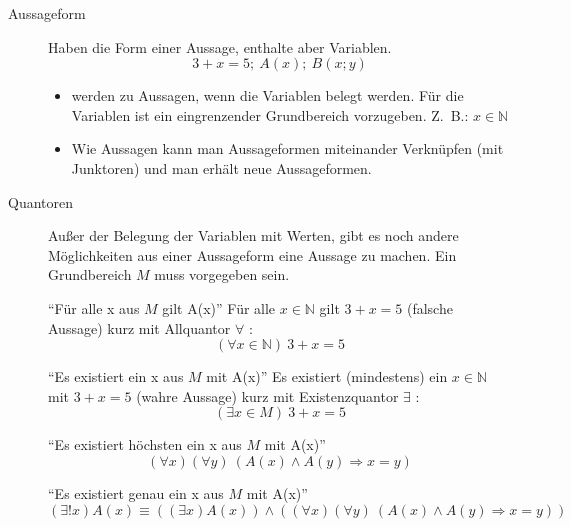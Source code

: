 \begin{description}
    \item[Aussageform] Haben die Form einer Aussage, enthalte aber Variablen.
    \[3 + x = 5;\ A(x);\ B(x;y)\]
    \begin{itemize}
        \item werden zu Aussagen, wenn die Variablen belegt werden.
        Für die Variablen ist ein eingrenzender Grundbereich vorzugeben.
        Z.~B.: $x \in \mathbb{N}$
        \item Wie Aussagen kann man Aussageformen miteinander Verknüpfen (mit Junktoren) und man erhält neue Aussageformen.
    \end{itemize}
    \item[Quantoren] Außer der Belegung der Variablen mit Werten, gibt es noch andere Möglichkeiten aus einer Aussageform eine Aussage zu machen.
    Ein Grundbereich $M$ muss vorgegeben sein.

    ``Für alle x aus $M$ gilt A(x)'' \newline
    Für alle $x \in \mathbb{N}$ gilt $3 + x = 5$ (falsche Aussage) kurz mit Allquantor $\forall$ :
    \[(\forall x \in \mathbb{N})\ 3 + x = 5\]

    ``Es existiert ein x aus $M$ mit A(x)'' \newline
    Es existiert (mindestens) ein $x \in \mathbb{N}$ mit $3 + x = 5$ (wahre Aussage) kurz mit Existenzquantor $\exists$ :
    \[(\exists x \in M)\ 3 + x = 5\]

    ``Es existiert höchsten ein x aus $M$ mit A(x)''
    \[(\forall x)(\forall y)\ (A(x) \wedge A(y) \Rightarrow x = y)\]

    ``Es existiert genau ein x aus $M$ mit A(x)''
    \[(\exists ! x) A(x) \equiv ((\exists x) A(x)) \wedge ((\forall x)(\forall y)\ (A(x) \wedge A(y) \Rightarrow x = y))\]
\end{description}

